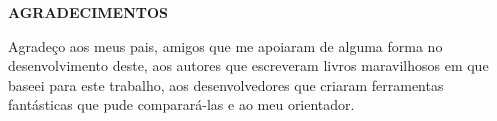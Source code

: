 \begin{newpage}
	\thispagestyle{empty}	
	\setlength{\parindent}{1.25cm} %
	\setlength{\baselineskip}{1.5\baselineskip} %
	\begin{center}
		\textbf{AGRADECIMENTOS} \\ [1.5\baselineskip]
	\end{center}
	
Agradeço aos meus pais, amigos que me apoiaram de alguma forma no desenvolvimento deste, aos autores que escreveram livros maravilhosos em que baseei
para este trabalho, aos desenvolvedores que criaram ferramentas fantásticas que pude comparará-las e ao meu orientador.  

\end{newpage}